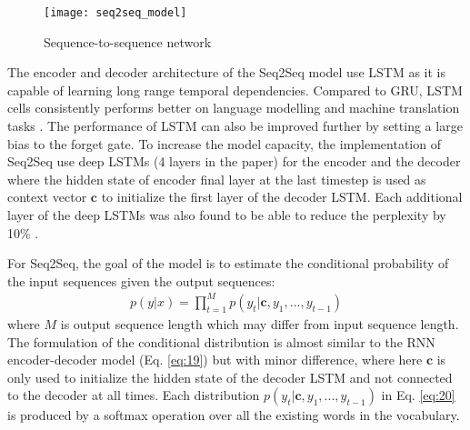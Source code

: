 \documentclass[12pt]{extarticle}
\begin{document}
\begin{figure}[ht]
\centering
\texttt{[image: seq2seq\_model]}
\caption{Sequence-to-sequence network}
\label{fig:seq2seq}
\end{figure}

The encoder and decoder architecture of the Seq2Seq model use LSTM as it is capable of learning long range temporal dependencies. Compared to GRU, LSTM cells consistently performs better on language modelling \citep{Jozefowicz:2015:EER:3045118.3045367} and machine translation tasks \citep{britz-etal-2017-massive}. The performance of LSTM can also be improved further by setting a large bias to the forget gate. To increase the model capacity, the implementation of Seq2Seq use deep LSTMs (4 layers in the paper) for the encoder and the decoder where the hidden state of encoder final layer at the last timestep is used as context vector $\textbf{c}$ to initialize the first layer of the decoder LSTM. Each additional layer of the deep LSTMs was also found to be able to reduce the perplexity by 10\% \citep{Sutskever:2014:SSL:2969033.2969173}. 

For Seq2Seq, the goal of the model is to estimate the conditional probability of the input sequences given the output sequences:
\begin{align}
p(y|x) = \prod_{t=1}^{M} p(y_{t} | \textbf{c}, y_{1},..., y_{t-1})  \label{eq:20}
\end{align}
where $M$ is output sequence length which may differ from input sequence length. The formulation of the conditional distribution is almost similar to the RNN encoder-decoder model (Eq. \ref{eq:19}) but with minor difference, where here $\textbf{c}$ is only used to initialize the hidden state of the decoder LSTM and not connected to the decoder at all times. Each distribution $p(y_{t} | \textbf{c}, y_{1},..., y_{t-1})$ in Eq. \ref{eq:20} is produced by a softmax operation over all the existing words in the vocabulary.
\end{document}
